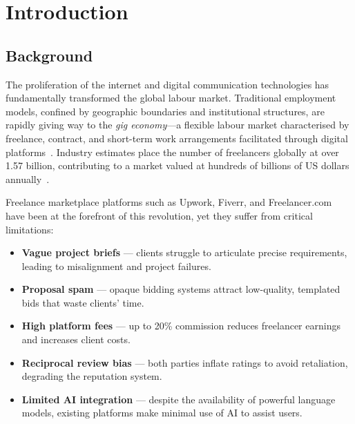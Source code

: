 
\chapter{Introduction}
\label{Chapter1}

\section{Background}

The proliferation of the internet and digital communication technologies has fundamentally
transformed the global labour market. Traditional employment models, confined by geographic
boundaries and institutional structures, are rapidly giving way to the \textit{gig
economy}---a flexible labour market characterised by freelance, contract, and short-term work
arrangements facilitated through digital platforms~\citep{Manyika2016}. Industry estimates
place the number of freelancers globally at over 1.57 billion, contributing to a market
valued at hundreds of billions of US dollars annually~\citep{Statista2023}.

Freelance marketplace platforms such as Upwork, Fiverr, and Freelancer.com have been at the
forefront of this revolution, yet they suffer from critical limitations:

\begin{featurebox}
\begin{itemize}
  \item \textbf{Vague project briefs} — clients struggle to articulate precise requirements,
        leading to misalignment and project failures.
  \item \textbf{Proposal spam} — opaque bidding systems attract low-quality, templated bids
        that waste clients' time.
  \item \textbf{High platform fees} — up to 20\% commission reduces freelancer earnings and
        increases client costs.
  \item \textbf{Reciprocal review bias} — both parties inflate ratings to avoid retaliation,
        degrading the reputation system.
  \item \textbf{Limited AI integration} — despite the availability of powerful language
        models, existing platforms make minimal use of AI to assist users.
\end{itemize}
\end{featurebox}

